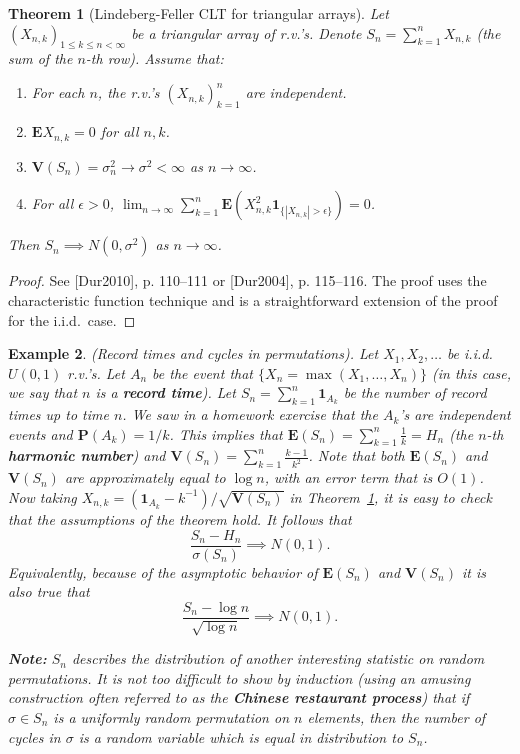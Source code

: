 \documentclass[12pt]{article}
\newtheorem{thm}{Theorem}[section]
\newcommand{\prob}{\mathbf{P}}
\newcommand{\expec}{\mathbf{E}}
\newcommand{\var}{\mathbf{V}}
\newcommand{\ind}{\textbf{1}}
\theoremstyle{example}
\newtheorem{example}[thm]{Example}
\begin{document}
\begin{thm}[Lindeberg-Feller CLT for triangular arrays]
Let $(X_{n,k})_{1\le k\le n<\infty}$ be a triangular array of r.v.'s. Denote $S_n = \sum_{k=1}^n X_{n,k}$ (the sum of the $n$-th row). Assume that:
\begin{enumerate}
\item For each $n$, the r.v.'s $(X_{n,k})_{k=1}^n$ are independent.
\item $\expec X_{n,k}=0$ for all $n,k$.
\item $\var(S_n) = \sigma_n^2 \to \sigma^2<\infty$ as $n\to\infty$.
\item For all $\epsilon>0$, ${\displaystyle \lim_{n\to\infty}} \sum_{k=1}^n \expec\left( X_{n,k}^2 \ind_{\{|X_{n,k}|>\epsilon\}}\right)=0$.
\end{enumerate}
Then $S_n \implies N(0,\sigma^2)$ as $n\to\infty$.
\label{thm-lindeberg-feller}
\end{thm}

\begin{proof} See [Dur2010], p. 110--111 or [Dur2004], p. 115--116. The proof uses the characteristic function technique and is a straightforward extension of the proof for the i.i.d.\ case.
\end{proof}

\begin{example} (Record times and cycles in permutations). Let $X_1, X_2, \ldots$ be i.i.d.\ $U(0,1)$ r.v.'s. Let $A_n$ be the event that $\{X_n = \max(X_1,\ldots,X_n)\}$ (in this case, we say that $n$ is a \textbf{record time}). Let $S_n = \sum_{k=1}^n \ind_{A_k}$ be the number of record times up to time $n$. We saw in a homework exercise that the $A_k$'s are independent events and $\prob(A_k) = 1/k$. This implies that $\expec(S_n) = \sum_{k=1}^n \frac{1}{k} = H_n$ (the $n$-th \textbf{harmonic number}) and $\var(S_n) = \sum_{k=1}^n \frac{k-1}{k^2}$. Note that both $\expec(S_n)$ and $\var(S_n)$ are approximately equal to $\log n$, with an error term that is $O(1)$. Now taking $X_{n,k} = (\ind_{A_k}-k^{-1})/\sqrt{\var(S_n)}$ in Theorem~\ref{thm-lindeberg-feller}, it is easy to check that the assumptions of the theorem hold. It follows that
$$ \frac{S_n-H_n}{\sigma(S_n)} \implies N(0,1). $$
Equivalently, because of the asymptotic behavior of $\expec(S_n)$ and $\var(S_n)$ it is also true that
$$ \frac{S_n-\log n}{\sqrt{\log n}} \implies N(0,1). $$

\noindent\textbf{Note:} $S_n$ describes the distribution of another interesting statistic on random permutations. It is not too difficult to show by induction (using an amusing construction often referred to as the \textbf{Chinese restaurant process}) that if $\sigma \in S_n$ is a uniformly random permutation on $n$ elements, then the number of cycles in $\sigma$ is a random variable which is equal in distribution to $S_n$.
\end{example}
\end{document}
